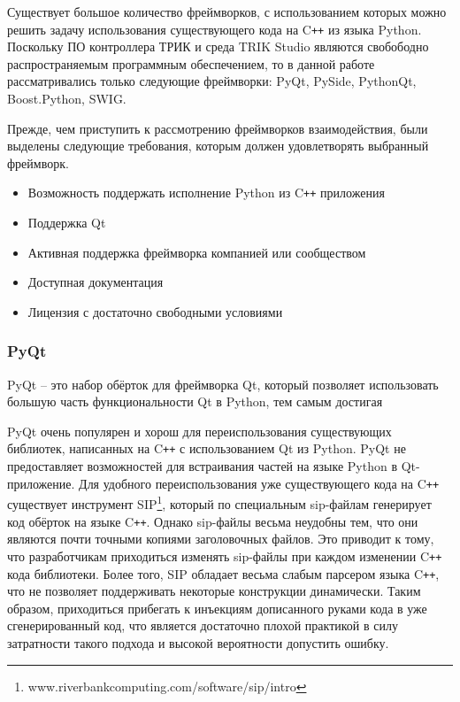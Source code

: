 \documentclass[14pt]{matmex-diploma-custom}
\begin{document}
Существует большое количество фреймворков, с использованием которых можно решить задачу использования существующего кода на C\texttt{++} из языка Python. Поскольку ПО контроллера ТРИК и среда TRIK Studio являются свобободно распространяемым программным обеспечением, то в данной работе рассматривались только следующие фреймворки: PyQt, PySide, PythonQt, Boost.Python, SWIG.

Прежде, чем приступить к рассмотрению фреймворков взаимодействия, были выделены следующие требования, которым должен удовлетворять выбранный фреймворк.

\begin{itemize}
    \item Возможность поддержать исполнение Python из C\texttt{++} приложения
    \item Поддержка Qt
    \item Активная поддержка фреймворка компанией или сообществом
    \item Доступная документация
    \item Лицензия с достаточно свободными условиями
\end{itemize}

\subsubsection{PyQt}

PyQt \cite{pyqt} -- это набор обёрток для фреймворка Qt, который позволяет использовать большую часть функциональности Qt в Python, тем самым достигая 

PyQt очень популярен и хорош для переиспользования существующих библиотек, написанных на C\texttt{++} с использованием Qt из Python. PyQt не предоставляет возможностей для встраивания частей на языке Python в Qt-приложение. Для удобного переиспользования уже существующего кода на C\texttt{++} существует инструмент SIP\footnote{www.riverbankcomputing.com/software/sip/intro}, который по специальным sip-файлам генерирует код обёрток на языке C\texttt{++}. Однако sip-файлы весьма неудобны тем, что они являются почти точными копиями заголовочных файлов. Это приводит к тому, что разработчикам приходиться изменять sip-файлы при каждом изменении C\texttt{++} кода библиотеки. Более того, SIP обладает весьма слабым парсером языка C\texttt{++}, что не позволяет поддерживать некоторые конструкции динамически. Таким образом, приходиться прибегать к инъекциям дописанного руками кода в уже сгенерированный код, что является достаточно плохой практикой в силу затратности такого подхода и высокой вероятности допустить ошибку.
\end{document}
